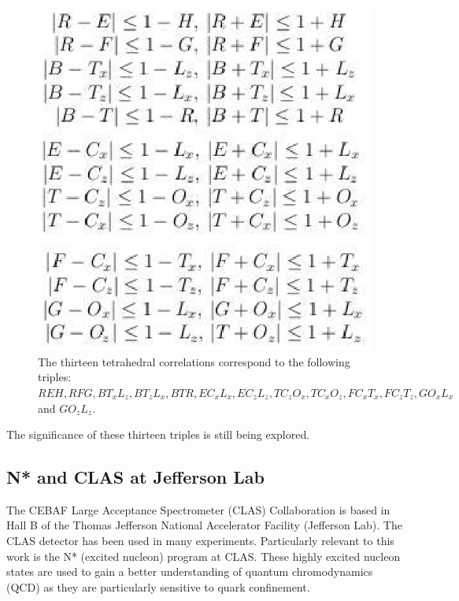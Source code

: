 \documentclass[a4paper,12pt]{article}
\begin{document}
\newpage
\begin{figure}[!ht]
 \begin{center}
  \includegraphics[scale=0.7]{ineqs.eps}
  \caption{The thirteen tetrahedral correlations correspond to the following triples: $REH, RFG, BT_{x}L_{z}, BT_{z}L_{x}, BTR, EC_{x}L_{x}, EC_{z}L_{z}, TC_{z}O_{x}, TC_{x}O_{z}, FC_{x}T_{x}, FC_{z}T_{z}, GO_{x}L_{x}$ and $GO_{z}L_{z}$.}
 \end{center}
\end{figure}

The significance of these thirteen triples is still being explored.
\newpage
\subsection{N* and CLAS at Jefferson Lab}
The CEBAF Large Acceptance Spectrometer (CLAS) Collaboration is based in Hall B of the Thomas Jefferson National Accelerator Facility (Jefferson Lab).  The CLAS detector has been used in many experiments.  Particularly relevant to this work is the N* (excited nucleon) program at CLAS.  These highly excited nucleon states are used to gain a better understanding of quantum chromodynamics (QCD) as they are particularly sensitive to quark confinement. \cite{nstar}
\end{document}

